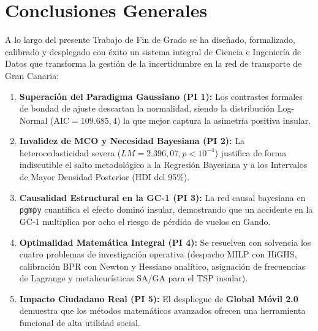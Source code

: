 \documentclass[11pt,a4paper,twoside]{report}
\begin{document}
\section{Conclusiones Generales}
A lo largo del presente Trabajo de Fin de Grado se ha diseñado, formalizado, calibrado y desplegado con éxito un sistema integral de Ciencia e Ingeniería de Datos que transforma la gestión de la incertidumbre en la red de transporte de Gran Canaria:
\begin{enumerate}
    \item \textbf{Superación del Paradigma Gaussiano (PI 1):} Los contrastes formales de bondad de ajuste descartan la normalidad, siendo la distribución Log-Normal ($\text{AIC} = 109.685,4$) la que mejor captura la asimetría positiva insular.
    \item \textbf{Invalidez de MCO y Necesidad Bayesiana (PI 2):} La heterocedasticidad severa ($LM = 2.396,07, p < 10^{-4}$) justifica de forma indiscutible el salto metodológico a la Regresión Bayesiana y a los Intervalos de Mayor Densidad Posterior (HDI del 95\%).
    \item \textbf{Causalidad Estructural en la GC-1 (PI 3):} La red causal bayesiana en \texttt{pgmpy} cuantifica el efecto dominó insular, demostrando que un accidente en la GC-1 multiplica por ocho el riesgo de pérdida de vuelos en Gando.
    \item \textbf{Optimalidad Matemática Integral (PI 4):} Se resuelven con solvencia los cuatro problemas de investigación operativa (despacho MILP con HiGHS, calibración BPR con Newton y Hessiano analítico, asignación de frecuencias de Lagrange y metaheurísticas SA/GA para el TSP insular).
    \item \textbf{Impacto Ciudadano Real (PI 5):} El despliegue de \textbf{Global Móvil 2.0} demuestra que los métodos matemáticos avanzados ofrecen una herramienta funcional de alta utilidad social.
\end{enumerate}
\end{document}
